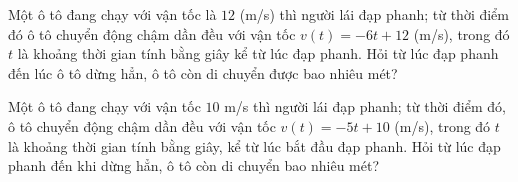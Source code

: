 \begin{ex}%
Một ô tô đang chạy với vận tốc là $12$ (m/s) thì người lái đạp phanh; từ thời điểm đó ô tô chuyển động chậm dần đều với vận tốc $v \left(t\right) = -6t+12$ (m/s), trong đó $t$ là khoảng thời gian tính bằng giây kể từ lúc đạp phanh. Hỏi từ lúc đạp phanh đến lúc ô tô dừng hẳn, ô tô còn di chuyển được bao nhiêu mét?
\end{ex}

\begin{ex}%
Một ô tô đang chạy với vận tốc $10$ m/s thì người lái đạp phanh; từ thời điểm đó, ô tô chuyển động chậm dần đều với vận tốc $v \left(t\right) = -5t+10$ (m/s), trong đó $t$ là khoảng thời gian tính bằng giây, kể từ lúc bắt đầu đạp phanh. Hỏi từ lúc đạp phanh đến khi dừng hẳn, ô tô còn di chuyển bao nhiêu mét?
\end{ex}

